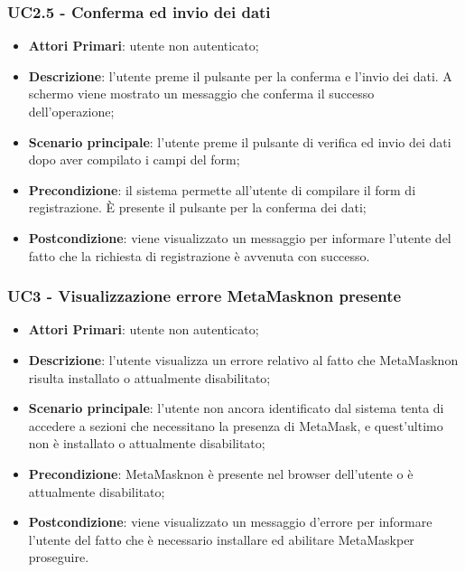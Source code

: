 \subsubsection{UC2.5 - Conferma ed invio dei dati}
\begin{itemize}
	\item \textbf{Attori Primari}: utente non autenticato;
	\item \textbf{Descrizione}:
	l'utente preme il pulsante per la conferma e l'invio dei dati. A schermo viene mostrato un messaggio che conferma il successo dell'operazione;
	\item \textbf{Scenario principale}: l'utente preme il pulsante di verifica ed invio dei dati dopo aver compilato i campi del form;
	\item \textbf{Precondizione}: il sistema permette all'utente di compilare il form di registrazione. \`E presente il pulsante per la conferma dei dati;
	\item \textbf{Postcondizione}: viene visualizzato un messaggio per informare l'utente del fatto che la richiesta di registrazione è avvenuta con successo.
\end{itemize}

\subsubsection{UC3 - Visualizzazione errore MetaMask\glosp non presente}
\begin{itemize}
	\item \textbf{Attori Primari}: utente non autenticato;
	\item \textbf{Descrizione}: l'utente visualizza un errore relativo al fatto che MetaMask\glosp non risulta installato o attualmente disabilitato;
	\item \textbf{Scenario principale}: l'utente non ancora identificato dal sistema tenta di accedere a sezioni che necessitano la presenza di MetaMask\glosp, e quest'ultimo non è installato o attualmente disabilitato;
	\item \textbf{Precondizione}: MetaMask\glosp non è presente nel browser dell'utente o è attualmente disabilitato;
	\item \textbf{Postcondizione}: viene visualizzato un messaggio d'errore per informare l'utente del fatto che è necessario installare ed abilitare MetaMask\glosp per proseguire.
	
\end{itemize}

